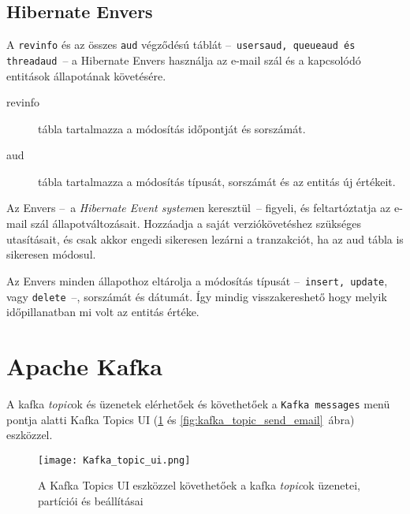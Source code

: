 \subsection{Hibernate Envers}\label{sec:hubernate_envers}
A \texttt{revinfo} és az összes \texttt{\textunderscore aud} végződésú táblát --~\texttt{\mbox{users\textunderscore aud}, \mbox{queue\textunderscore aud} és \mbox{thread\textunderscore aud}}~--   a Hibernate Envers használja az e-mail szál és a kapcsolódó entitások állapotának követésére.

\begin{description}
	\item[revinfo] tábla tartalmazza a módosítás időpontját és sorszámát.
	
	\item[\textunderscore aud] tábla tartalmazza a módosítás típusát, sorszámát és az entitás új értékeit.
\end{description}

Az Envers --~a \emph{Hibernate Event system}en keresztül~--   figyeli, és feltartóztatja az e-mail szál állapotváltozásait. Hozzáadja a saját verziókövetéshez szükséges utasításait, és csak akkor engedi sikeresen lezárni a tranzakciót, ha az \textunderscore aud tábla is sikeresen módosul.

Az Envers minden állapothoz eltárolja a módosítás típusát --~\texttt{insert, update}, vagy \texttt{delete}~--,   sorszámát és dátumát. Így mindig visszakereshető hogy melyik időpillanatban mi volt az entitás értéke.



\section{Apache Kafka}\label{sec:kafka_topics}
A kafka \emph{topic}ok és üzenetek elérhetőek és követhetőek a \texttt{Kafka messages} menü pontja alatti Kafka Topics UI (\ref{fig:Kafka_Topics_UI} és \ref{fig:kafka_topic_send_email}~ábra) eszközzel.

\begin{figure}[hbt] 
	\centering
	\texttt{[image: Kafka\_topic\_ui.png]}
	\caption[A Kafka Topics UI felülete]{A Kafka Topics UI eszközzel követhetőek a kafka \emph{topic}ok üzenetei, partíciói és beállításai}
	\label{fig:Kafka_Topics_UI}
\end{figure}


